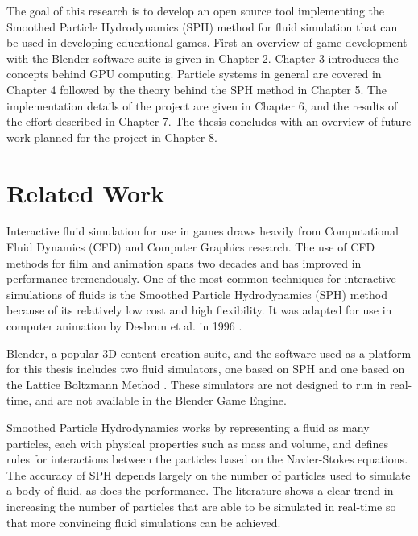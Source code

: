 The goal of this research is to develop an open source tool implementing the
Smoothed Particle Hydrodynamics (SPH) method for fluid simulation that can be
used in developing educational games. First an overview of game development
with the Blender software suite is given in Chapter 2.  
Chapter 3 introduces the concepts behind GPU computing. Particle systems in
general are covered in Chapter 4 followed by the theory behind the SPH method
in Chapter 5. The implementation details of the project are given in Chapter 6,
and the results of the effort described in Chapter 7. The thesis concludes with
an overview of future work planned for the project in Chapter 8. 


\section{Related Work}

Interactive fluid simulation for use in games draws heavily from Computational
Fluid Dynamics (CFD) and Computer Graphics research. The use of CFD methods for
film and animation spans two decades \cite{Tan2009} and has improved in
performance tremendously. One of the most common techniques for interactive
simulations of fluids is the Smoothed Particle Hydrodynamics (SPH) method
because of its relatively low cost and high flexibility. It was adapted for use
in computer animation by Desbrun et al. in 1996 \cite{Desbrun1996}. 

Blender, a popular 3D content creation suite, and the software used as a
platform for this thesis includes two fluid simulators, one based on SPH
\cite{Clavet2005} and one based on the Lattice Boltzmann Method
\cite{Nils2006}. These simulators are not designed to run in real-time,
and are not available in the Blender Game Engine. 

Smoothed Particle Hydrodynamics works by representing a fluid as many
particles, each with physical properties such as mass and volume, and defines
rules for interactions between the particles based on the Navier-Stokes
equations. The accuracy of SPH depends largely on the number of particles used
to simulate a body of fluid, as does the performance. The literature shows a
clear trend in increasing the number of particles that are able to be simulated
in real-time so that more convincing fluid simulations can be achieved.


